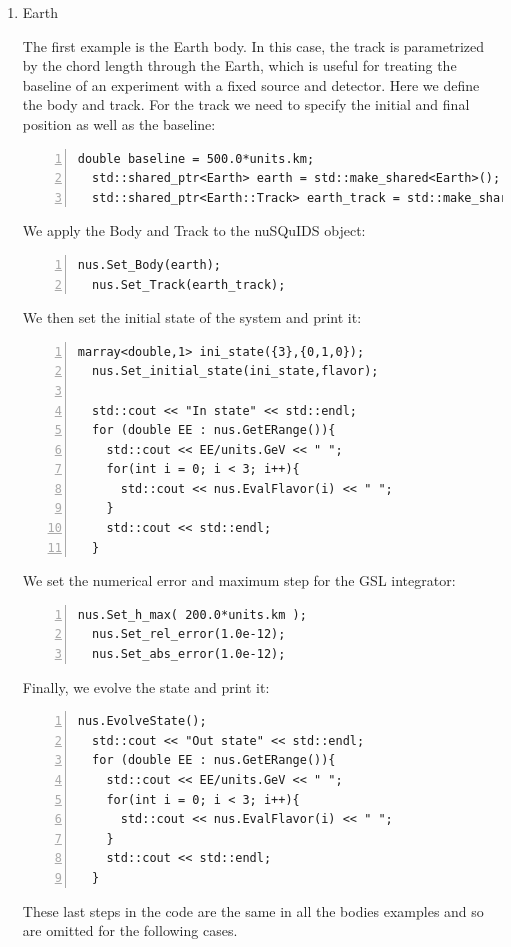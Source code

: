 \documentclass[3p,12pt]{elsarticle}
\newcommand{\ttf}{\ttfamily}
\begin{document}
\begin{enumerate}
\item {\ttf Earth}

The first example is the {\ttf Earth} body. In this case, the track is
parametrized by the chord length through the Earth, which is useful for treating the baseline of an experiment with a fixed source and detector. 
Here we define the body and track. For the track we need to specify the initial and final
position as well as the baseline: 
\begin{lstlisting}[frame=leftline, numbers =
  left,breaklines=true,label = ex:sin1,firstnumber=last]
  double baseline = 500.0*units.km;
  std::shared_ptr<Earth> earth = std::make_shared<Earth>();
  std::shared_ptr<Earth::Track> earth_track = std::make_shared<Earth::Track>(0.0,baseline,baseline);
\end{lstlisting}
We apply the Body and Track to the nuSQuIDS object:
\begin{lstlisting}[frame=leftline, numbers =
  left,breaklines=true,label = ex:sin1,firstnumber=last]
  nus.Set_Body(earth);
  nus.Set_Track(earth_track);
\end{lstlisting}

We then set the initial state of the system and print it:
\begin{lstlisting}[frame=leftline, numbers =
  left,breaklines=true,label = ex:sin1,firstnumber=last]
  marray<double,1> ini_state({3},{0,1,0});
  nus.Set_initial_state(ini_state,flavor);
  
  std::cout << "In state" << std::endl;
  for (double EE : nus.GetERange()){
    std::cout << EE/units.GeV << " ";
    for(int i = 0; i < 3; i++){
      std::cout << nus.EvalFlavor(i) << " ";
    }
    std::cout << std::endl;
  }
\end{lstlisting}
We set the numerical error and maximum step for the GSL integrator:
\begin{lstlisting}[frame=leftline, numbers =
  left,breaklines=true,label = ex:sin1,firstnumber=last]
  nus.Set_h_max( 200.0*units.km );
  nus.Set_rel_error(1.0e-12);
  nus.Set_abs_error(1.0e-12);
\end{lstlisting}

Finally, we evolve the state and print it:
\begin{lstlisting}[frame=leftline, numbers =
  left,breaklines=true,label = ex:sin1,firstnumber=last]
  nus.EvolveState();
  std::cout << "Out state" << std::endl;
  for (double EE : nus.GetERange()){
    std::cout << EE/units.GeV << " ";
    for(int i = 0; i < 3; i++){
      std::cout << nus.EvalFlavor(i) << " ";
    }
    std::cout << std::endl;
  }
\end{lstlisting}
These last steps in the code are the same in all the bodies examples and so are omitted for the following cases.


\end{enumerate}
\end{document}
